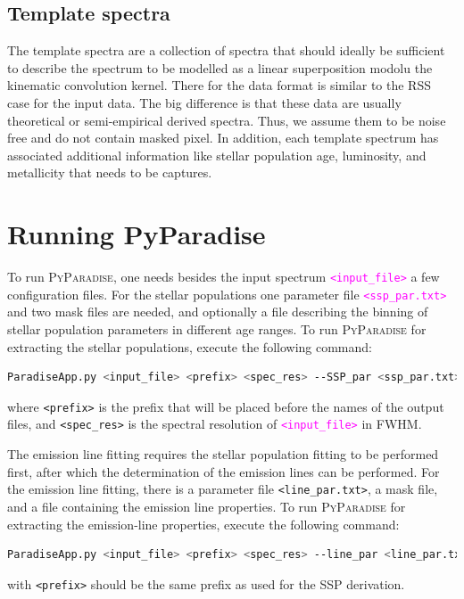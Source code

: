 \documentclass[usenatbib,usegraphicx,useAMS,onecolumn]{mn2e}
\newcommand{\codeline}[1]{\lstinline|#1|}
\newcommand{\fname}[1]{\textcolor{magenta}{\codeline{#1}}}
\begin{document}
\subsection{Template spectra}
\label{subsec:data_templates}
The template spectra are a collection of spectra that should ideally be sufficient to describe the spectrum to be modelled as a linear superposition modolu the kinematic convolution kernel.
There for the data format is similar to the RSS case for the input data.
The big difference is that these data are usually theoretical or semi-empirical derived spectra.
Thus, we assume them to be noise free and do not contain masked pixel.
In addition, each template spectrum has associated additional information like stellar population age, luminosity, and metallicity that needs to be captures. 


\section{Running PyParadise}
\label{sec:usage}
To run \textsc{PyParadise}, one needs besides the input spectrum \fname{<input_file>} a few configuration files.
For the stellar populations one parameter file \fname{<ssp_par.txt>} and two mask files are needed, and optionally a file describing the binning of stellar population parameters in different age ranges.
To run \textsc{PyParadise} for extracting the stellar populations, execute the following command:
\begin{lstlisting}[language=sh]
    ParadiseApp.py <input_file> <prefix> <spec_res> --SSP_par <ssp_par.txt>
\end{lstlisting}
where \codeline{<prefix>} is the prefix that will be placed before the names of the output files, and \codeline{<spec_res>} is the spectral resolution of \fname{<input_file>} in FWHM.

The emission line fitting requires the stellar population fitting to be performed first, after which the determination of the emission lines can be performed.
For the emission line fitting, there is a parameter file \codeline{<line_par.txt>}, a mask file, and a file containing the emission line properties.
To run \textsc{PyParadise} for extracting the emission-line properties, execute the following command:
\begin{lstlisting}[language=sh]
    ParadiseApp.py <input_file> <prefix> <spec_res> --line_par <line_par.txt>
\end{lstlisting}
with \codeline{<prefix>} should be the same prefix as used for the SSP derivation.
\end{document}
